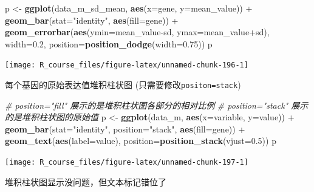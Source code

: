 \documentclass[]{article}
\newenvironment{Shaded}{\begin{snugshade}}{\end{snugshade}}
\newcommand{\KeywordTok}[1]{\textcolor[rgb]{0.13,0.29,0.53}{\textbf{{#1}}}}
\newcommand{\DataTypeTok}[1]{\textcolor[rgb]{0.13,0.29,0.53}{{#1}}}
\newcommand{\FloatTok}[1]{\textcolor[rgb]{0.00,0.00,0.81}{{#1}}}
\newcommand{\StringTok}[1]{\textcolor[rgb]{0.31,0.60,0.02}{{#1}}}
\newcommand{\CommentTok}[1]{\textcolor[rgb]{0.56,0.35,0.01}{\textit{{#1}}}}
\newcommand{\NormalTok}[1]{{#1}}
\numberwithin{figure}{section}
\numberwithin{table}{section}
\theoremstyle{definition}
\theoremstyle{definition}
\theoremstyle{definition}
\theoremstyle{remark}
\begin{document}
\begin{Shaded}
\begin{Highlighting}[]
\NormalTok{p <-}\StringTok{ }\KeywordTok{ggplot}\NormalTok{(data_m_sd_mean, }\KeywordTok{aes}\NormalTok{(}\DataTypeTok{x=}\NormalTok{gene, }\DataTypeTok{y=}\NormalTok{mean_value)) +}\StringTok{ }
\StringTok{    }\KeywordTok{geom_bar}\NormalTok{(}\DataTypeTok{stat=}\StringTok{"identity"}\NormalTok{, }\KeywordTok{aes}\NormalTok{(}\DataTypeTok{fill=}\NormalTok{gene)) +}
\StringTok{    }\KeywordTok{geom_errorbar}\NormalTok{(}\KeywordTok{aes}\NormalTok{(}\DataTypeTok{ymin=}\NormalTok{mean_value-sd, }\DataTypeTok{ymax=}\NormalTok{mean_value+sd), }\DataTypeTok{width=}\FloatTok{0.2}\NormalTok{, }
        \DataTypeTok{position=}\KeywordTok{position_dodge}\NormalTok{(}\DataTypeTok{width=}\FloatTok{0.75}\NormalTok{))}
\NormalTok{p}
\end{Highlighting}
\end{Shaded}

\begin{center}\texttt{[image: R\_course\_files/figure-latex/unnamed-chunk-196-1]} \end{center}

每个基因的原始表达值堆积柱状图 (只需要修改\texttt{positon=stack})

\begin{Shaded}
\begin{Highlighting}[]
\CommentTok{# position="fill" 展示的是堆积柱状图各部分的相对比例}
\CommentTok{# position="stack" 展示的是堆积柱状图的原始值}
\NormalTok{p <-}\StringTok{ }\KeywordTok{ggplot}\NormalTok{(data_m, }\KeywordTok{aes}\NormalTok{(}\DataTypeTok{x=}\NormalTok{variable, }\DataTypeTok{y=}\NormalTok{value)) +}
\StringTok{    }\KeywordTok{geom_bar}\NormalTok{(}\DataTypeTok{stat=}\StringTok{"identity"}\NormalTok{, }\DataTypeTok{position=}\StringTok{"stack"}\NormalTok{, }\KeywordTok{aes}\NormalTok{(}\DataTypeTok{fill=}\NormalTok{gene)) +}
\StringTok{    }\KeywordTok{geom_text}\NormalTok{(}\KeywordTok{aes}\NormalTok{(}\DataTypeTok{label=}\NormalTok{value), }\DataTypeTok{position=}\KeywordTok{position_stack}\NormalTok{(}\DataTypeTok{vjust=}\FloatTok{0.5}\NormalTok{))}
\NormalTok{p}
\end{Highlighting}
\end{Shaded}

\begin{center}\texttt{[image: R\_course\_files/figure-latex/unnamed-chunk-197-1]} \end{center}

堆积柱状图显示没问题，但文本标记错位了
\end{document}
